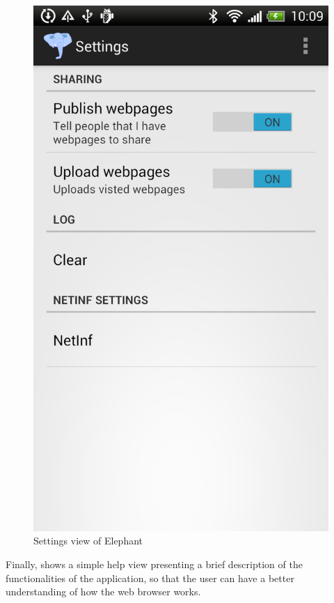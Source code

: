 \begin{figure}
\centering
\includegraphics[scale=0.29]{img/ele_settings.png}
\caption{Settings view of Elephant}\label{fig:ele_settings}
\end{figure}

\newpage
Finally,  shows a simple help view presenting a brief description of the functionalities of the application,
so that the user can have a better understanding of how the web browser works.\\

